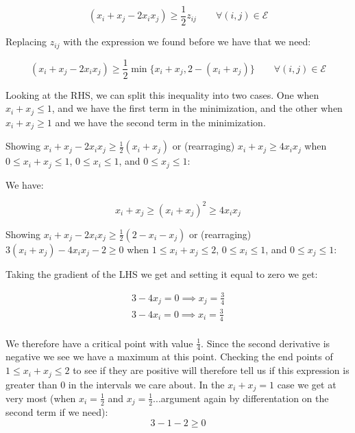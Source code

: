 \documentclass{article}
\begin{document}
$$(x_i + x_j - 2x_ix_j) \geq \frac{1}{2} z_{ij} \qquad \forall (i,j) \in \mathcal{E}$$

Replacing $z_{ij}$ with the expression we found before we have that we need:

$$(x_i + x_j - 2x_ix_j) \geq \frac{1}{2}  \min\{x_i + x_j, 2 - (x_i + x_j)\} \qquad \forall (i,j) \in \mathcal{E}$$

Looking at the RHS, we can split this inequality into two cases. One when $x_i + x_j \leq 1$, and we have the first term in the minimization, and the other when $x_i + x_j \geq 1$ and we have the second term in the minimization.

\vspace{3mm}

\noindent Showing $x_i + x_j - 2x_ix_j \geq \frac{1}{2} (x_i + x_j)$ or (rearraging) $x_i + x_j \geq 4x_ix_j$  when $0 \leq x_i + x_j \leq 1$, $0 \leq x_i \leq 1$, and  $0 \leq x_j \leq 1$:

\vspace{3mm}

We have:

$$x_i + x_j \geq (x_i + x_j)^2 \geq 4x_ix_j$$

\vspace{3mm}

\noindent Showing  $x_i + x_j - 2x_ix_j \geq \frac{1}{2} (2 - x_i - x_j)$ or (rearraging) $3(x_i + x_j) - 4x_ix_j - 2 \geq 0$ when $1 \leq x_i + x_j \leq 2$, $0 \leq x_i \leq 1$, and  $0 \leq x_j \leq 1$:

\vspace{3mm}

\noindent Taking the gradient of the LHS we get and setting it equal to zero we get:

\begin{gather*}
  3 - 4x_j = 0 \implies x_j = \frac{3}{4}\\
  3 - 4x_i = 0 \implies x_i = \frac{3}{4}\\
\end{gather*}

We therefore have a critical point with value $\frac{1}{4}$. Since the second derivative is negative we see we have a maximum at this point. Checking the end points of $1 \leq x_i + x_j \leq 2$ to see if they are positive will therefore tell us if this expression is greater than 0 in the intervals we care about. In the $x_i + x_j = 1$ case we get at very most (when $x_i = \frac{1}{2}$ and $x_j = \frac{1}{2}$...argument again by differentation on the second term if we need):
$$3 - 1 -2 \geq 0$$
\end{document}
